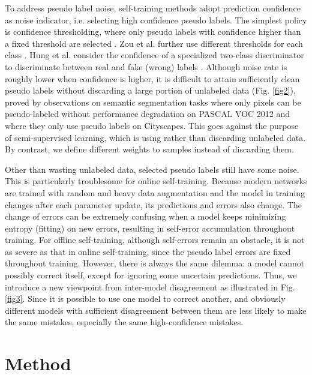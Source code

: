 \documentclass[preprint,review,10pt]{elsarticle}
\begin{document}
To address pseudo label noise, self-training methods adopt prediction confidence as noise indicator, i.e. selecting high confidence pseudo labels. The simplest policy is confidence thresholding, where only pseudo labels with confidence higher than a fixed threshold are selected \cite{lee2013pseudo}. Zou et al. further use different thresholds for each class \cite{cbst}. Hung et al. consider the confidence of a specialized two-class discriminator to discriminate between real and fake (wrong) labels \cite{hung}. Although noise rate is roughly lower when confidence is higher, it is difficult to attain sufficiently clean pseudo labels without discarding a large portion of unlabeled data (Fig. \ref{fig2}), proved by observations on semantic segmentation tasks \cite{hung} where only  pixels can be pseudo-labeled without performance degradation on PASCAL VOC 2012 and \cite{crst} where they only use  pseudo labels on Cityscapes. This goes against the purpose of semi-supervised learning, which is using rather than discarding unlabeled data. By contrast, we define different weights to samples instead of discarding them.

Other than wasting unlabeled data, selected pseudo labels still have some noise. This is particularly troublesome for online self-training. Because modern networks are trained with random and heavy data augmentation and the model in training changes after each parameter update, its predictions and errors also change. The change of errors can be extremely confusing when a model keeps minimizing entropy (fitting) on new errors, resulting in self-error accumulation throughout training. For offline self-training, although self-errors remain an obstacle, it is not as severe as that in online self-training, since the pseudo label errors are fixed throughout training.
However, there is always the same dilemma: a model cannot possibly correct itself, except for ignoring some uncertain predictions. Thus, we introduce a new viewpoint from inter-model disagreement as illustrated in Fig. \ref{fig3}. Since it is possible to use one model to correct another, and obviously different models with sufficient disagreement between them are less likely to make the same mistakes, especially the same high-confidence mistakes.



\section{Method}
\label{sec:4}
\end{document}
